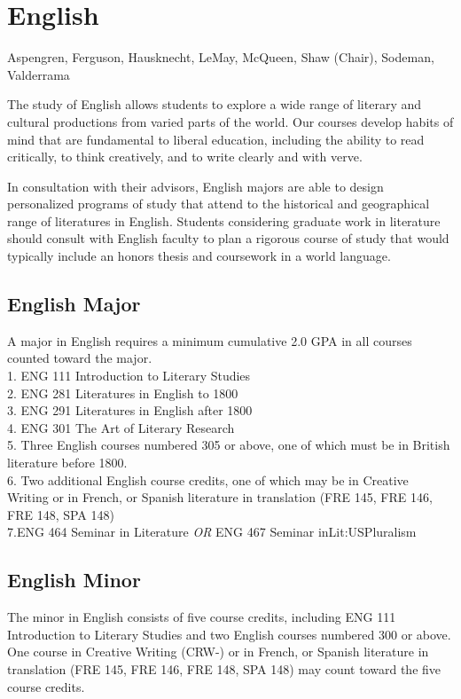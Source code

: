 \documentclass[
  letterpaper,
]{scrbook}
\begin{document}
\section{English}\label{sec-english}

Aspengren, Ferguson, Hausknecht, LeMay, McQueen, Shaw (Chair), Sodeman,
Valderrama

The study of English allows students to explore a wide range of literary
and cultural productions from varied parts of the world. Our courses
develop habits of mind that are fundamental to liberal education,
including the ability to read critically, to think creatively, and to
write clearly and with verve.

In consultation with their advisors, English majors are able to design
personalized programs of study that attend to the historical and
geographical range of literatures in English. Students considering
graduate work in literature should consult with English faculty to plan
a rigorous course of study that would typically include an honors thesis
and coursework in a world language.

\subsection{English Major}\label{english-major}

A major in English requires a minimum cumulative 2.0 GPA in all courses
counted toward the major.\\
1. ENG 111 Introduction to Literary Studies\\
2. ENG 281 Literatures in English to 1800\\
3. ENG 291 Literatures in English after 1800\\
4. ENG 301 The Art of Literary Research\\
5. Three English courses numbered 305 or above, one of which must be in
British literature before 1800.\\
6. Two additional English course credits, one of which may be in
Creative Writing or in French, or Spanish literature in translation (FRE
145, FRE 146, FRE 148, SPA 148)\\
7.ENG 464 Seminar in Literature \emph{OR} ENG 467 Seminar
inLit:USPluralism

\subsection{English Minor}\label{english-minor}

The minor in English consists of five course credits, including ENG 111
Introduction to Literary Studies and two English courses numbered 300 or
above. One course in Creative Writing (CRW-) or in French, or Spanish
literature in translation (FRE 145, FRE 146, FRE 148, SPA 148) may count
toward the five course credits.
\end{document}

